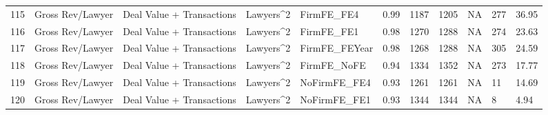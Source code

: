 \documentclass{article}
\begin{document}
\begin{table}[H]
\begin{tabular}{rllllllllll}
  115 & Gross Rev/Lawyer & Deal Value + Transactions & Lawyers^2 & FirmFE\_FE4 & 0.99 & 1187 & 1205 & NA & 277 & 36.95 \\ 
  116 & Gross Rev/Lawyer & Deal Value + Transactions & Lawyers^2 & FirmFE\_FE1 & 0.98 & 1270 & 1288 & NA & 274 & 23.63 \\ 
  117 & Gross Rev/Lawyer & Deal Value + Transactions & Lawyers^2 & FirmFE\_FEYear & 0.98 & 1268 & 1288 & NA & 305 & 24.59 \\ 
  118 & Gross Rev/Lawyer & Deal Value + Transactions & Lawyers^2 & FirmFE\_NoFE & 0.94 & 1334 & 1352 & NA & 273 & 17.77 \\ 
  119 & Gross Rev/Lawyer & Deal Value + Transactions & Lawyers^2 & NoFirmFE\_FE4 & 0.93 & 1261 & 1261 & NA & 11 & 14.69 \\ 
  120 & Gross Rev/Lawyer & Deal Value + Transactions & Lawyers^2 & NoFirmFE\_FE1 & 0.93 & 1344 & 1344 & NA & 8 & 4.94 \\ 
   \hline
\end{tabular}
\end{table}
\end{document}
